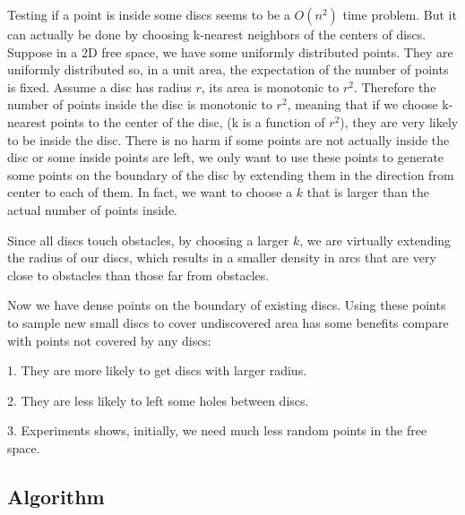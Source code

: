 \documentclass[12pt]{article}
\begin{document}
  Testing if a point is inside some discs seems to be a $O(n^2)$ time problem. But it can actually be done by choosing k-nearest neighbors of the centers of discs. Suppose in a 2D free space, we have some uniformly distributed points. They are uniformly distributed so, in a unit area, the expectation of the number of points is fixed. Assume a disc has radius $r$, its area is monotonic to $r^2$. Therefore the number of points inside the disc is monotonic to $r^2$, meaning that if we choose k-nearest points to the center of the disc, (k is a function of $r^2$), they are very likely to be inside the disc. There is no harm if some points are not actually inside the disc or some inside points are left, we only want to use these points to generate some points on the boundary of the disc by extending them in the direction from center to each of them. In fact, we want to choose a $k$ that is larger than the actual number of points inside.
  
  Since all discs touch obstacles, by choosing a larger $k$, we are virtually extending the radius of our discs, which results in a smaller density in arcs that are very close to obstacles than those far from obstacles.
  
  Now we have dense points on the boundary of existing discs. Using these points to sample new small discs to cover undiscovered area has some benefits compare with points not covered by any discs:
  
  1. They are more likely to get discs with larger radius. 
  
  2. They are less likely to left some holes between discs. 
  
  3. Experiments shows, initially, we need much less random points in the free space.
  

  \subsection{Algorithm}
  
\end{document}
